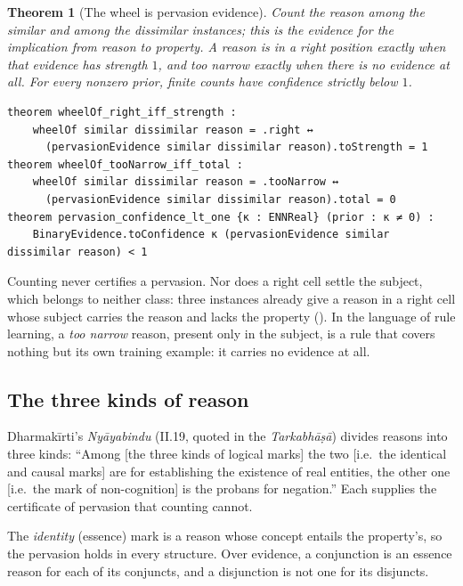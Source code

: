 \documentclass[11pt]{article}
\newcommand{\lean}[1]{\texttt{\detokenize{#1}}}
\theoremstyle{plain}
\newtheorem{theorem}{Theorem}[section]
\theoremstyle{definition}
\begin{document}
\begin{theorem}[The wheel is pervasion evidence]
Count the reason among the similar and among the dissimilar instances; this is the evidence
for the implication from reason to property. A reason is in a \emph{right} position exactly
when that evidence has strength $1$, and \emph{too narrow} exactly when there is no evidence at
all. For every nonzero prior, finite counts have confidence strictly below $1$.
\end{theorem}

\begin{lstlisting}
theorem wheelOf_right_iff_strength :
    wheelOf similar dissimilar reason = .right ↔
      (pervasionEvidence similar dissimilar reason).toStrength = 1
theorem wheelOf_tooNarrow_iff_total :
    wheelOf similar dissimilar reason = .tooNarrow ↔
      (pervasionEvidence similar dissimilar reason).total = 0
theorem pervasion_confidence_lt_one {κ : ENNReal} (prior : κ ≠ 0) :
    BinaryEvidence.toConfidence κ (pervasionEvidence similar dissimilar reason) < 1
\end{lstlisting}

\noindent Counting never certifies a pervasion. Nor does a right cell settle the subject,
which belongs to neither class: three instances already give a reason in a right cell whose
subject carries the reason and lacks the property (\lean{right_cell_not_conclusive}). In the
language of rule learning, a \emph{too narrow} reason, present only in the subject, is a rule
that covers nothing but its own training example: it carries no evidence at all.

\subsection{The three kinds of reason}

Dharmakīrti's \emph{Nyāyabindu} (II.19, quoted in the \emph{Tarkabhāṣā}) divides reasons
into three kinds: ``Among [the three kinds of logical marks] the two [i.e.\ the identical
and causal marks] are for establishing the existence of real entities, the other one [i.e.\
the mark of non-cognition] is the probans for negation.'' Each supplies the certificate of
pervasion that counting cannot.

The \emph{identity} (essence) mark is a reason whose concept entails the property's, so the
pervasion holds in every structure. Over evidence, a conjunction is an essence reason for each
of its conjuncts, and a disjunction is not one for its disjuncts.
\end{document}

